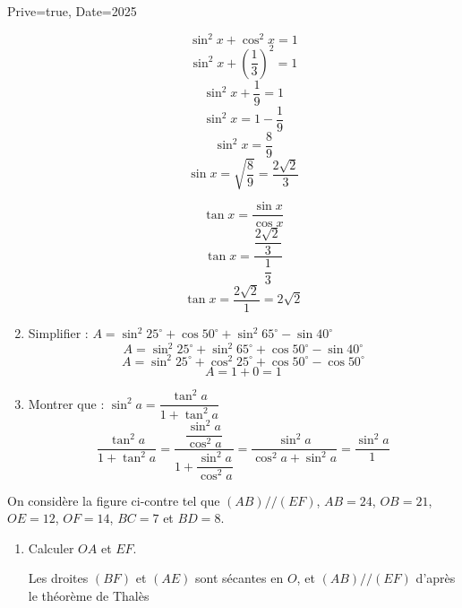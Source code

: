 \documentclass[a4paper,12pt]{article}
\begin{document}
\begin{Maquette}[Exam]{Prive=true, Date=2025}
\begin{exercice}[BaremeDetaille]
\begin{enumerate}
\begin{minipage}{0.48\linewidth}
$$\sin^{2}x+\cos^{2}x=1$$
$$\sin^{2}x+\left(\dfrac{1}{3}\right)^{2}=1$$
$$\sin^{2}x+\dfrac{1}{9}=1$$
$$\sin^{2}x=1-\dfrac{1}{9}$$
$$\sin^{2}x=\dfrac{8}{9}$$
$$\sin x=\sqrt{\dfrac{8}{9}}=\dfrac{2\sqrt{2}}{3}$$
\end{minipage}\hfill\vrule\hfill%
\begin{minipage}{0.48\linewidth}
$$\tan x=\dfrac{\sin x}{\cos x}$$
$$\tan x=\dfrac{\dfrac{2\sqrt{2}}{3}}{\dfrac{1}{3}}$$
$$\tan x=\dfrac{2\sqrt{2}}{1}=2\sqrt{2}$$
\end{minipage}
\item{} Simplifier  :
$A = \sin^{2}25^{\circ} +\cos50^{\circ} +\sin^{2}65^{\circ}-\sin40^{\circ}$
$$A = \sin^{2}25^{\circ} +\sin^{2}65^{\circ}+\cos50^{\circ}-\sin40^{\circ}$$
$$A = \sin^{2}25^{\circ} +\cos^{2}25^{\circ}+\cos50^{\circ}-\cos50^{\circ}$$
$$A = 1+0=1$$
\item{} Montrer que : $\sin^{2}a = \dfrac{\tan^{2}a}{1+\tan^{2}a}$
$$\dfrac{\tan^{2}a}{1+\tan^{2}a}=\dfrac{\dfrac{\sin^{2}a}{\cos^{2}a}}{1+\dfrac{\sin^{2}a}{\cos^{2}a}}=\dfrac{\sin^{2}a}{\cos^{2}a+\sin^{2}a}=\dfrac{\sin^{2}a}{1}$$

\end{enumerate}
\end{exercice}

\begin{exercice}[BaremeDetaille]
On considère la figure ci-contre tel que $(AB)//(EF)$, $AB=24$, $OB=21$, $OE=12$, $OF=14$, $BC=7$ et $BD=8$.
\vspace*{2mm}

\begin{minipage}{.7\linewidth}
\begin{enumerate}
\item{} Calculer $OA$ et $EF$.

Les droites $(BF)$ et $(AE)$ sont sécantes en $O$, et $(AB)//(EF)$ d'après le théorème de Thalès 


\end{enumerate}
\end{minipage}
\end{exercice}
\end{Maquette}
\end{document}

